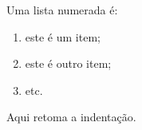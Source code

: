Uma lista numerada é:
\begin{enumerate}
 \item este é um item;
 \item este é outro item;
 \item etc.
\end{enumerate}
Aqui retoma a indentação.
